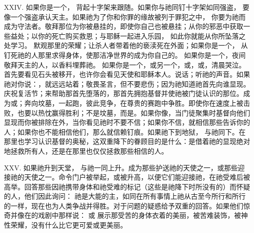 XXIV. 如果你是一个， 背起十字架来跟随。如果你与祂同钉十字架如同强盗， 要像一个强盗承认天主。如果祂为了你和你罪的缘故被列于罪犯之中， 你要为祂而成为守法者。敬拜那位为你被悬挂的，即使你自己也被悬挂；从你的邪恶中获取一些益处；以你的死亡购买救恩；与耶稣一起进入乐园， 如此你就能从你所坠落之处学习。 默观那里的荣耀；让杀人者带着他的亵渎死在外面；如果你是一个， 从钉死祂的人那里求得身体，使那洁净世界的成为你自己的。 如果你是一个，夜间敬拜天主的人，以香料埋葬祂。 如果你是一个，或另一个，或，或，清晨哭泣。首先要看见石头被移开，也许你会看见天使和耶稣本人。说话；听祂的声音。如果祂对你说：，就远远站着；敬畏圣言，但不要悲伤；因为祂知道祂首先向谁显现。庆祝复活节；来帮助那首先堕落的，那首先拥抱基督并使祂被门徒认识的那位。成为或；奔向坟墓，一起跑，彼此竞争，在尊贵的赛跑中争胜。即使你在速度上被击败，也要以热忱赢得胜利；不是坟墓，而是。如果你像，当门徒聚集时基督向他们显现而你被排除在外，当你看见祂时不要不信；如果你不信，就相信那些告诉你的人；如果你也不能相信他们，那么就信赖钉痕。如果祂下到地狱， 与祂同下。在那里也学习认识基督的奥秘，这双重降下的眷顾目的是什么：是借着祂的显现绝对地拯救所有人，还是在那里也仅仅拯救那些相信的人。\par

XXV. 如果祂升到天堂， 与祂一同上升。成为那些护送祂的天使之一，或那些迎接祂的天使之一。命令门户被举起，或被升高，以便它们能迎接祂，在祂受难后被高举。回答那些因祂携带身体和祂受难的标记（这些是祂降下时所没有的）而怀疑的人，他们因此询问： 祂是大能的主，如同在所有事情上祂从古至今所行和所行的一样，现在也为人类争战并得胜。对于问题的疑惑给予双重的回答。如果他们惊奇并像在的戏剧中那样说： 或   展示那受苦的身体衣着的美丽，被苦难装饰，被神性荣耀，没有什么比它更可爱或更美丽。\par

